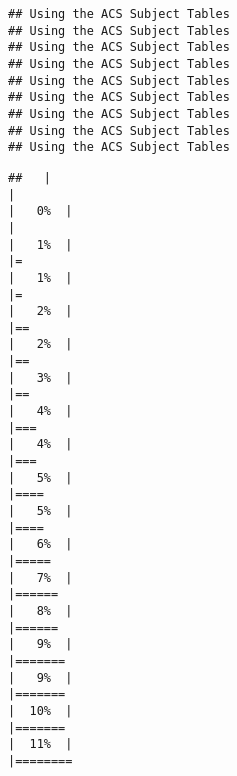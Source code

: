 \documentclass[
]{article}
\begin{document}
\begin{verbatim}
## Using the ACS Subject Tables
## Using the ACS Subject Tables
## Using the ACS Subject Tables
## Using the ACS Subject Tables
## Using the ACS Subject Tables
## Using the ACS Subject Tables
## Using the ACS Subject Tables
## Using the ACS Subject Tables
## Using the ACS Subject Tables
\end{verbatim}

\begin{verbatim}
##   |                                                                              |                                                                      |   0%  |                                                                              |                                                                      |   1%  |                                                                              |=                                                                     |   1%  |                                                                              |=                                                                     |   2%  |                                                                              |==                                                                    |   2%  |                                                                              |==                                                                    |   3%  |                                                                              |==                                                                    |   4%  |                                                                              |===                                                                   |   4%  |                                                                              |===                                                                   |   5%  |                                                                              |====                                                                  |   5%  |                                                                              |====                                                                  |   6%  |                                                                              |=====                                                                 |   7%  |                                                                              |======                                                                |   8%  |                                                                              |======                                                                |   9%  |                                                                              |=======                                                               |   9%  |                                                                              |=======                                                               |  10%  |                                                                              |=======                                                               |  11%  |                                                                              |========           
\end{verbatim}
\end{document}

